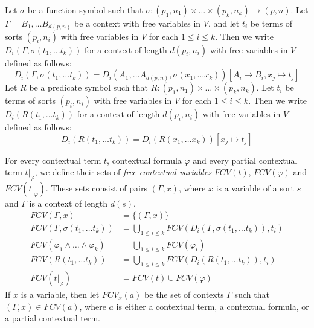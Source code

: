 \documentclass[reqno]{amsart}
\theoremstyle{definition}
\theoremstyle{remark}
\numberwithin{figure}{section}
\begin{document}
Let $\sigma$ be a function symbol such that $\sigma : (p_1,n_1) \times \ldots \times (p_k,n_k) \to (p,n)$.
Let $\Gamma = B_1, \ldots B_{d(p,n)}$ be a context with free variables in $V$, and let $t_i$ be terms of sorts $(p_i,n_i)$ with free variables in $V$ for each $1 \leq i \leq k$.
Then we write $D_i(\Gamma, \sigma(t_1, \ldots t_k))$ for a context of length $d(p_i,n_i)$ with free variables in $V$ defined as follows:
\[ D_i(\Gamma, \sigma(t_1, \ldots t_k)) = D_i(A_1, \ldots A_{d(p,n)}, \sigma(x_1, \ldots x_k))[A_i \mapsto B_i, x_j \mapsto t_j] \]
Let $R$ be a predicate symbol such that $R : (p_1,n_1) \times \ldots \times (p_k,n_k)$.
Let $t_i$ be terms of sorts $(p_i,n_i)$ with free variables in $V$ for each $1 \leq i \leq k$.
Then we write $D_i(R(t_1, \ldots t_k))$ for a context of length $d(p_i,n_i)$ with free variables in $V$ defined as follows:
\[ D_i(R(t_1, \ldots t_k)) = D_i(R(x_1, \ldots x_k))[x_j \mapsto t_j] \]

For every contextual term $t$, contextual formula $\varphi$ and every partial contextual term $t|_\varphi$,
we define their sets of \emph{free contextual variables} $FCV(t)$, $FCV(\varphi)$ and $FCV(t|_\varphi)$.
These sets consist of pairs $(\Gamma,x)$, where $x$ is a variable of a sort $s$ and $\Gamma$ is a context of length $d(s)$.
\begin{align*}
FCV(\Gamma,x) & = \{ (\Gamma,x) \} \\
FCV(\Gamma, \sigma(t_1, \ldots t_k)) & = \bigcup_{1 \leq i \leq k} FCV(D_i(\Gamma,\sigma(t_1, \ldots t_k)), t_i) \\
FCV(\varphi_1 \land \ldots \land \varphi_k) & = \bigcup_{1 \leq i \leq k} FCV(\varphi_i) \\
FCV(R(t_1, \ldots t_k)) & = \bigcup_{1 \leq i \leq k} FCV(D_i(R(t_1, \ldots t_k)), t_i) \\
FCV(t|_\varphi) & = FCV(t) \cup FCV(\varphi)
\end{align*}
If $x$ is a variable, then let $FCV_x(a)$ be the set of contexts $\Gamma$ such that $(\Gamma,x) \in FCV(a)$,
where $a$ is either a contextual term, a contextual formula, or a partial contextual term.
\end{document}
